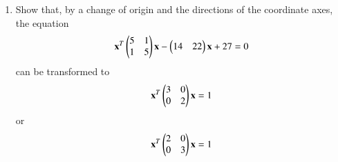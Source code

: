 \begin{enumerate}[label=\arabic*.,ref=\thesubsection.\theenumi]
\\
\solution

\item Show that, by a change of origin and the directions of the coordinate axes, the equation
\begin{align}
\mathbf{x}^T\begin{pmatrix}5 & 1\\ 1 & 5\end{pmatrix}\mathbf{x}-\begin{pmatrix}14 & 22\end{pmatrix}\mathbf{x}+27= 0
\end{align}
can be transformed to
\begin{align}
\mathbf{x}^T\begin{pmatrix}3 & 0\\ 0 & 2\end{pmatrix}\mathbf{x}= 1
\end{align}
or
\begin{align}
\mathbf{x}^T\begin{pmatrix}2 & 0\\ 0 & 3\end{pmatrix}\mathbf{x}= 1
\end{align}
\end{enumerate}
